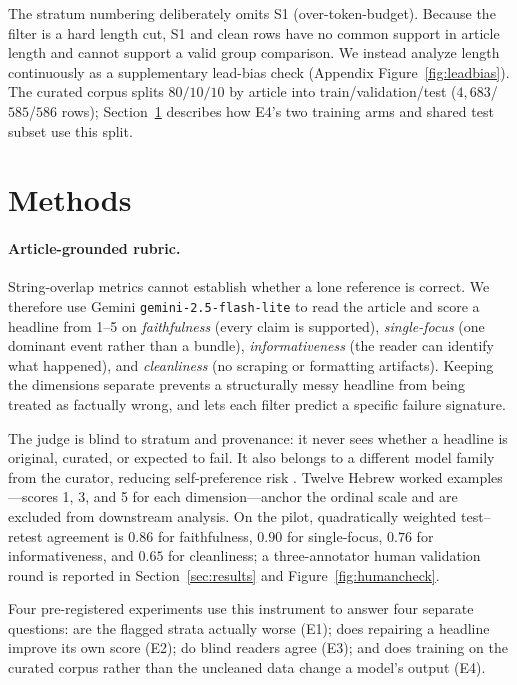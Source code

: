 \documentclass[11pt]{article}
\begin{document}
The stratum numbering deliberately omits S1 (over-token-budget). Because the filter is a hard length
cut, S1 and clean rows have no common support in article length and cannot support a valid group
comparison. We instead analyze length continuously as a supplementary lead-bias check
(Appendix Figure~\ref{fig:leadbias}). The curated corpus splits $80/10/10$ by article into
train/validation/test ($4{,}683$/$585$/$586$ rows); Section~\ref{sec:methods} describes how E4's two
training arms and shared test subset use this split.

\section{Methods}
\label{sec:methods}

\paragraph{Article-grounded rubric.}
String-overlap metrics cannot establish whether a lone reference is correct. We therefore use Gemini
\texttt{gemini-2.5-flash-lite} to read the article and score a headline from 1--5 on
\emph{faithfulness} (every claim is supported), \emph{single-focus} (one dominant event rather than a
bundle), \emph{informativeness} (the reader can identify what happened), and \emph{cleanliness} (no
scraping or formatting artifacts). Keeping the dimensions separate prevents a structurally messy
headline from being treated as factually wrong, and lets each filter predict a specific failure
signature.

The judge is blind to stratum and provenance: it never sees whether a headline is original, curated, or
expected to fail. It also belongs to a different model family from the curator, reducing self-preference
risk \citep{panickssery2024llm}. Twelve Hebrew worked examples---scores 1, 3, and 5 for each
dimension---anchor the ordinal scale and are excluded from downstream analysis. On the pilot,
quadratically weighted test--retest agreement is $0.86$ for faithfulness, $0.90$ for single-focus,
$0.76$ for informativeness, and $0.65$ for cleanliness; a three-annotator human validation round
is reported in Section~\ref{sec:results} and Figure~\ref{fig:humancheck}.

Four pre-registered experiments use this instrument to answer four separate questions: are the flagged
strata actually worse (E1); does repairing a headline improve its own score (E2); do blind readers agree
(E3); and does training on the curated corpus rather than the uncleaned data change a model's output
(E4).
\end{document}
